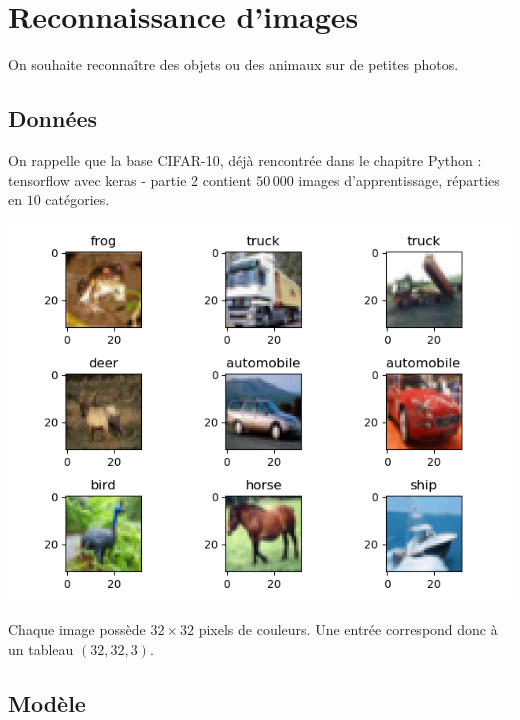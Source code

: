 \documentclass[11pt,class=report,crop=false]{standalone}
\begin{document}
\section{Reconnaissance d'images}

On souhaite reconnaître des objets ou des animaux sur de petites photos.

\subsection{Données}

On rappelle que la base CIFAR-10, déjà rencontrée dans le chapitre \og{}Python : tensorflow avec keras - partie 2\fg{} contient $50\,000$ images d'apprentissage, réparties en $10$ catégories.

\begin{center}
\includegraphics[scale=\myscale,scale=0.7]{figures/tfconv-images-train}
\end{center}

Chaque image possède $32\times 32$ pixels de couleurs. Une entrée correspond donc à un tableau
$(32,32,3)$.


\subsection{Modèle}
\end{document}
